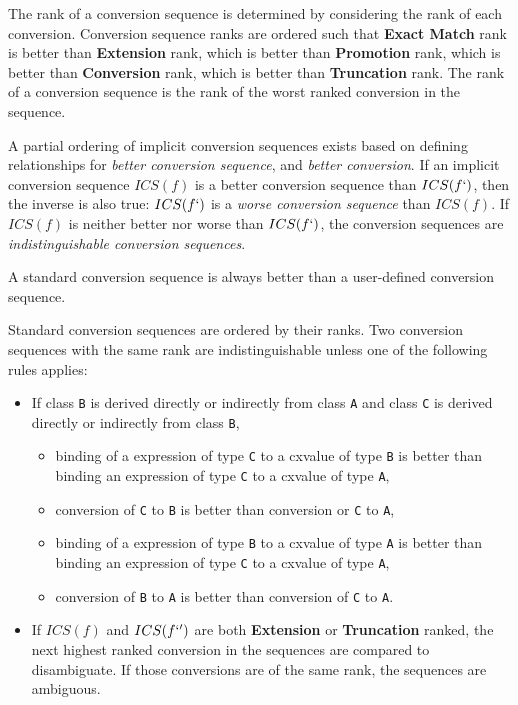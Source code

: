 \p The rank of a conversion sequence is determined by considering the rank of
each conversion. Conversion sequence ranks are ordered such that \textbf{Exact
Match} rank is better than \textbf{Extension} rank, which is better than
\textbf{Promotion} rank, which is better than \textbf{Conversion} rank, which is
better than \textbf{Truncation} rank. The rank of a conversion sequence is the
rank of the worst ranked conversion in the sequence.



\p A partial ordering of implicit conversion sequences exists based on defining
relationships for \textit{better conversion sequence}, and \textit{better
conversion}. If an implicit conversion sequence \(ICS(f)\) is a better
conversion sequence than \(ICS(f`)\), then the inverse is also true: \(ICS(f`)\)
is a \textit{worse conversion sequence} than \(ICS(f)\). If \(ICS(f)\) is
neither better nor worse than \(ICS(f`)\), the conversion sequences are
\textit{indistinguishable conversion sequences}.

\p A standard conversion sequence is always better than a user-defined
conversion sequence.

\p Standard conversion sequences are ordered by their ranks. Two conversion
sequences with the same rank are indistinguishable unless one of the following
rules applies:

\begin{itemize}
  \item If class \texttt{B} is derived directly or indirectly from class
  \texttt{A} and class \texttt{C} is derived directly or indirectly from class
  \texttt{B},
  \begin{itemize}
    \item binding of a expression of type \texttt{C} to a cxvalue of type
    \texttt{B} is better than binding an expression of type \texttt{C} to a
    cxvalue of type \texttt{A},
    \item conversion of \texttt{C} to \texttt{B} is better than conversion or
    \texttt{C} to \texttt{A},
    \item binding of a expression of type \texttt{B} to a cxvalue of type
    \texttt{A} is better than binding an expression of type \texttt{C} to a
    cxvalue of type \texttt{A},
    \item conversion of \texttt{B} to \texttt{A} is better than conversion of
    \texttt{C} to \texttt{A}.
  \end{itemize}
  \item If \(ICS(f)\) and \(ICS(f`')\) are both \textbf{Extension} or
  \textbf{Truncation} ranked, the next highest ranked conversion in the
  sequences are compared to disambiguate. If those conversions are of the same
  rank, the sequences are ambiguous.
\end{itemize}
